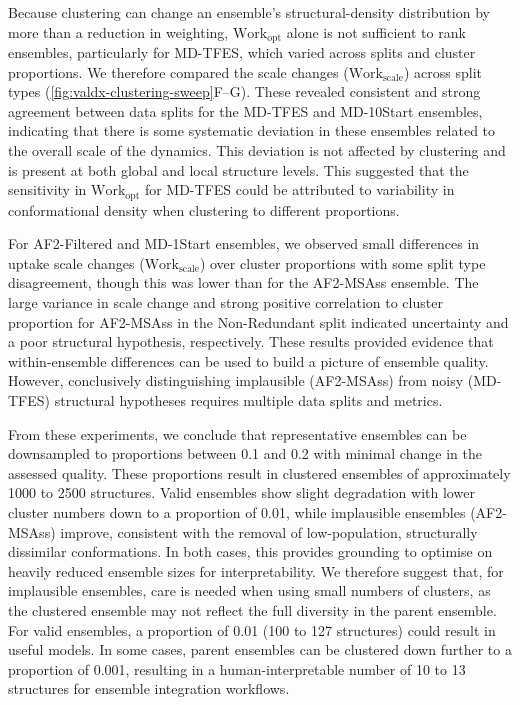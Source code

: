 Because clustering can change an ensemble's structural-density distribution by more than a reduction in weighting, $\text{Work}_\text{opt}$ alone is not sufficient to rank ensembles, particularly for MD-TFES, which varied across splits and cluster proportions. We therefore compared the scale changes ($\text{Work}_\text{scale}$) across split types (\cref{fig:valdx-clustering-sweep}F--G). These revealed consistent and strong agreement between data splits for the MD-TFES and MD-10Start ensembles, indicating that there is some systematic deviation in these ensembles related to the overall scale of the dynamics. This deviation is not affected by clustering and is present at both global and local structure levels. This suggested that the sensitivity in $\text{Work}_\text{opt}$ for MD-TFES could be attributed to variability in conformational density when clustering to different proportions.

For AF2-Filtered and MD-1Start ensembles, we observed small differences in uptake scale changes ($\text{Work}_\text{scale}$) over cluster proportions with some split type disagreement, though this was lower than for the AF2-MSAss ensemble. The large variance in scale change and strong positive correlation to cluster proportion for AF2-MSAss in the Non-Redundant split indicated uncertainty and a poor structural hypothesis, respectively. These results provided evidence that within-ensemble differences can be used to build a picture of ensemble quality. However, conclusively distinguishing implausible (AF2-MSAss) from noisy (MD-TFES) structural hypotheses requires multiple data splits and metrics.

From these experiments, we conclude that representative ensembles can be downsampled to proportions between 0.1 and 0.2 with minimal change in the assessed quality. These proportions result in clustered ensembles of approximately 1000 to 2500 structures. Valid ensembles show slight degradation with lower cluster numbers down to a proportion of 0.01, while implausible ensembles (AF2-MSAss) improve, consistent with the removal of low-population, structurally dissimilar conformations. In both cases, this provides grounding to optimise on heavily reduced ensemble sizes for interpretability. We therefore suggest that, for implausible ensembles, care is needed when using small numbers of clusters, as the clustered ensemble may not reflect the full diversity in the parent ensemble. For valid ensembles, a proportion of 0.01 (100 to 127 structures) could result in useful models. In some cases, parent ensembles can be clustered down further to a proportion of 0.001, resulting in a human-interpretable number of 10 to 13 structures for ensemble integration workflows.

